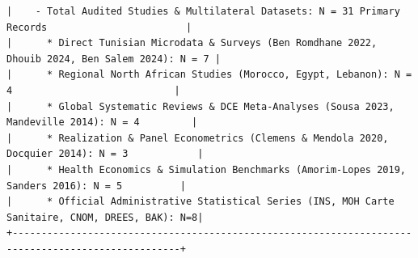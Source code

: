 \documentclass[
  11pt,
  a4paper]{article}
\begin{document}
\begin{verbatim}
|    - Total Audited Studies & Multilateral Datasets: N = 31 Primary Records                        |
|      * Direct Tunisian Microdata & Surveys (Ben Romdhane 2022, Dhouib 2024, Ben Salem 2024): N = 7 |
|      * Regional North African Studies (Morocco, Egypt, Lebanon): N = 4                            |
|      * Global Systematic Reviews & DCE Meta-Analyses (Sousa 2023, Mandeville 2014): N = 4         |
|      * Realization & Panel Econometrics (Clemens & Mendola 2020, Docquier 2014): N = 3            |
|      * Health Economics & Simulation Benchmarks (Amorim-Lopes 2019, Sanders 2016): N = 5          |
|      * Official Administrative Statistical Series (INS, MOH Carte Sanitaire, CNOM, DREES, BAK): N=8|
+---------------------------------------------------------------------------------------------------+
\end{verbatim}
\end{document}

